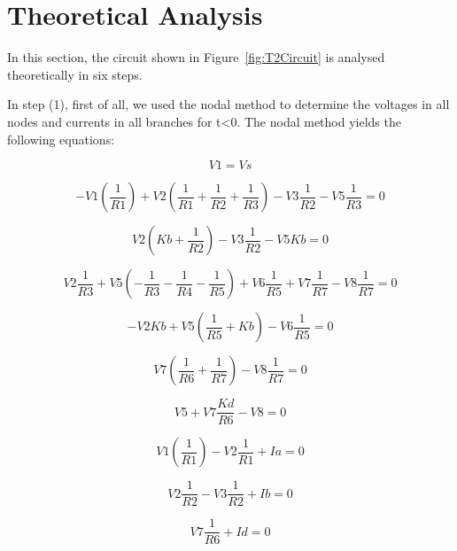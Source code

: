 \section{Theoretical Analysis}
\label{sec:analysis}

In this section, the circuit shown in Figure~\ref{fig:T2Circuit} is analysed theoretically in six steps.

In step (1), first of all, we used the nodal method to determine the voltages in all nodes and currents in all branches for t<0. 
The nodal method yields the following equations:

\begin{equation}
    V1 = Vs
\end{equation}

\begin{equation}
  -V1(\frac{1}{R1})+ V2(\frac{1}{R1}+\frac{1}{R2}+\frac{1}{R3})  - V3\frac{1}{R2} - V5\frac{1}{R3} = 0
\end{equation}

\begin{equation}
  V2(Kb+\frac{1}{R2}) -V3\frac{1}{R2} - V5Kb = 0
\end{equation}

\begin{equation}
  V2\frac{1}{R3}  + V5(-\frac{1}{R3}-\frac{1}{R4}-\frac{1}{R5}) + V6\frac{1}{R5} + V7\frac{1}{R7} - V8\frac{1}{R7} = 0
\end{equation}

\begin{equation}
  -V2Kb + V5(\frac{1}{R5}+Kb) - V6\frac{1}{R5}= 0
\end{equation}

\begin{equation}
  V7(\frac{1}{R6}+\frac{1}{R7}) - V8\frac{1}{R7}= 0
\end{equation}

\begin{equation}
  V5 + V7\frac{Kd}{R6} - V8 = 0
\end{equation}

\begin{equation}
 V1(\frac{1}{R1}) - V2\frac{1}{R1} + Ia= 0
\end{equation}

\begin{equation}
  V2\frac{1}{R2} - V3\frac{1}{R2} + Ib= 0
\end{equation}

\begin{equation}
  V7\frac{1}{R6} + Id= 0
\end{equation}


